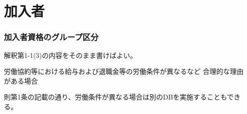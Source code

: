 \section{加入者}

\subsubsection{加入者資格のグループ区分}

\begin{itembox}[l]{}
  解釈第1-1(3)の内容をそのまま書けばよい。

  
\end{itembox}

\begin{sol}

  \;

  労働協約等における給与および退職金等の労働条件が異なるなど
  合理的な理由がある場合
\end{sol}

\begin{shadebox}

  則第1条の記載の通り、労働条件が異なる場合は別のDBを実施することもできる。

\end{shadebox}

\newpage